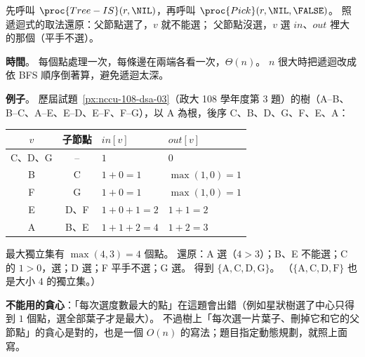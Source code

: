 \begin{pastsoln}
先呼叫 $\proc{Tree-IS}(r, \NIL)$，再呼叫 $\proc{Pick}(r, \NIL, \FALSE)$。  照遞迴式的取法還原：父節點選了，$v$ 就不能選；
父節點沒選，$v$ 選 $\mathit{in}$、$\mathit{out}$ 裡大的那個（平手不選）。

\textbf{時間}。 每個點處理一次，每條邊在兩端各看一次，$\Theta(n)$。 $n$ 很大時把遞迴改成依 BFS 順序倒著算，避免遞迴太深。

\textbf{例子}。 歷屆試題~\ref{px:nccu-108-dsa-03}（政大 108 學年度第 3 題）的樹（A--B、B--C、A--E、E--D、E--F、F--G），以 A 為根，後序 C、B、D、G、F、E、A：
\begin{center}
\small
\begin{tabular}{ccll}
\toprule
$v$ & 子節點 & $\mathit{in}[v]$ & $\mathit{out}[v]$ \\
\midrule
C、D、G & -- & $1$ & $0$ \\
B & C & $1 + 0 = 1$ & $\max(1, 0) = 1$ \\
F & G & $1 + 0 = 1$ & $\max(1, 0) = 1$ \\
E & D、F & $1 + 0 + 1 = 2$ & $1 + 1 = 2$ \\
A & B、E & $1 + 1 + 2 = 4$ & $1 + 2 = 3$ \\
\bottomrule
\end{tabular}
\end{center}
最大獨立集有 $\max(4, 3) = 4$ 個點。 還原：A 選（$4 > 3$）；B、E 不能選；C 的 $1 > 0$，選；D 選；F 平手不選；G 選。 得到
$\{\mathrm{A, C, D, G}\}$。 （$\{\mathrm{A, C, D, F}\}$ 也是大小 $4$ 的獨立集。）

\textbf{不能用的貪心}：「每次選度數最大的點」在這題會出錯（例如星狀樹選了中心只得到 $1$ 個點，選全部葉子才是最大）。
不過樹上「每次選一片葉子、刪掉它和它的父節點」的貪心是對的，也是一個 $O(n)$ 的寫法；題目指定動態規劃，就照上面寫。
\end{pastsoln}
